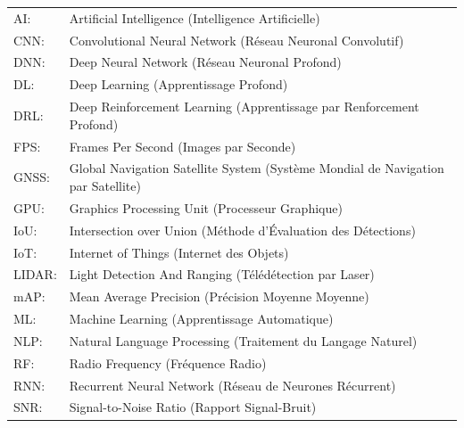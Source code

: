 \documentclass[12pt]{report}
\newcommand{\hlinecolor}{\arrayrulecolor{myColor}\hline\arrayrulecolor{black}}
\begin{document}
\begin{tabular}{p{} p{}}  \hlinecolor

\raggedright \textcolor{myColor}{AI: } &  Artificial Intelligence (Intelligence Artificielle)    \\
\raggedright \textcolor{myColor}{CNN: } &  Convolutional Neural Network (Réseau Neuronal Convolutif)   \\
\raggedright \textcolor{myColor}{DNN: } &  Deep Neural Network (Réseau Neuronal Profond)   \\
\raggedright \textcolor{myColor}{DL: } &  Deep Learning (Apprentissage Profond)  \\
\raggedright \textcolor{myColor}{DRL: } & Deep Reinforcement Learning (Apprentissage par Renforcement Profond)  \\
\raggedright \textcolor{myColor}{FPS: } & Frames Per Second (Images par Seconde) \\
\raggedright \textcolor{myColor}{GNSS: } & Global Navigation Satellite System (Système Mondial de Navigation par Satellite) \\
\raggedright \textcolor{myColor}{GPU: } & Graphics Processing Unit (Processeur Graphique) \\
\raggedright \textcolor{myColor}{IoU: } & Intersection over Union (Méthode d’Évaluation des Détections) \\
\raggedright \textcolor{myColor}{IoT: } & Internet of Things (Internet des Objets) \\
\raggedright \textcolor{myColor}{LIDAR: } & Light Detection And Ranging (Télédétection par Laser) \\
\raggedright \textcolor{myColor}{mAP: } & Mean Average Precision (Précision Moyenne Moyenne) \\
\raggedright \textcolor{myColor}{ML: } & Machine Learning (Apprentissage Automatique) \\
\raggedright \textcolor{myColor}{NLP: } & Natural Language Processing (Traitement du Langage Naturel) \\
\raggedright \textcolor{myColor}{RF: } & Radio Frequency (Fréquence Radio) \\
\raggedright \textcolor{myColor}{RNN: } & Recurrent Neural Network (Réseau de Neurones Récurrent) \\
\raggedright \textcolor{myColor}{SNR: } & Signal-to-Noise Ratio (Rapport Signal-Bruit) \\

\end{tabular}
\end{document}
